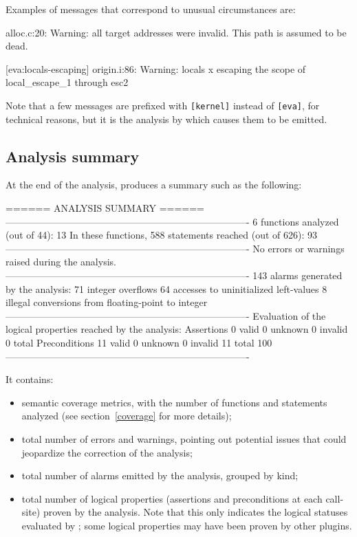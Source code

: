 \documentclass{frama-c-book}
\begin{document}
Examples of messages that correspond to unusual circumstances are:
\begin{logs}
[kernel] alloc.c:20: Warning:
  all target addresses were invalid. This path is assumed to be dead.

[eva:locals-escaping] origin.i:86: Warning:
  locals {x} escaping the scope of local_escape_1 through esc2
\end{logs}

Note that a few messages are prefixed with \verb|[kernel]| instead of
\verb|[eva]|, for technical reasons, but it is the analysis by \Eva{}
which causes them to be emitted.

\subsection{Analysis summary}

At the end of the analysis, \Eva{} produces a summary such as the
following:

\begin{logs}
 ====== ANALYSIS SUMMARY ======
  ----------------------------------------------------------------------------
  6 functions analyzed (out of 44): 13%
  In these functions, 588 statements reached (out of 626): 93%
  ----------------------------------------------------------------------------
  No errors or warnings raised during the analysis.
  ----------------------------------------------------------------------------
  143 alarms generated by the analysis:
      71 integer overflows
      64 accesses to uninitialized left-values
       8 illegal conversions from floating-point to integer
  ----------------------------------------------------------------------------
  Evaluation of the logical properties reached by the analysis:
    Assertions        0 valid     0 unknown     0 invalid      0 total
    Preconditions    11 valid     0 unknown     0 invalid     11 total
  100%
  ----------------------------------------------------------------------------
\end{logs}

It contains:

\begin{itemize}
\item semantic coverage metrics, with the number of functions and
  statements analyzed (see section \ref{coverage} for more details);
\item total number of errors and warnings, pointing out potential issues that
  could jeopardize the correction of the analysis;
\item total number of alarms emitted by the analysis, grouped by kind;
\item total number of logical properties (assertions and preconditions at each call-site)
  proven by the analysis.
  Note that this only indicates the logical statuses evaluated by \Eva{};
  some logical properties may have been proven by other plugins.
\end{itemize}
\end{document}
